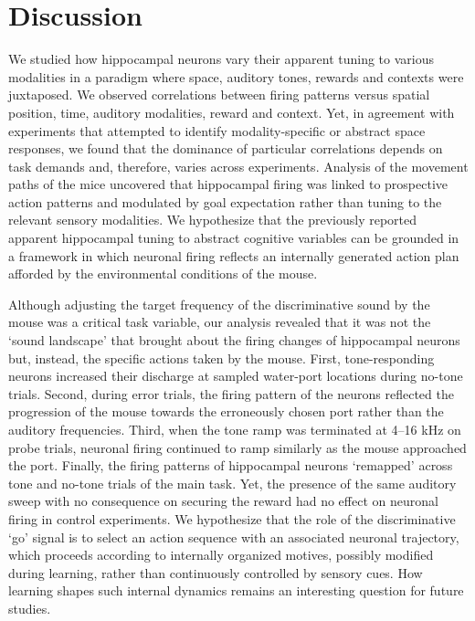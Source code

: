 \section{Discussion}

We studied how hippocampal neurons vary their apparent tuning to various modalities in a paradigm where space, auditory tones, rewards and contexts were juxtaposed. We observed correlations between firing patterns versus spatial position, time, auditory modalities, reward and context. Yet, in agreement with experiments that attempted to identify modality-specific or abstract space responses, we found that the dominance of particular correlations depends on task demands and, therefore, varies across experiments. Analysis of the movement paths of the mice uncovered that hippocampal firing was linked to prospective action patterns and modulated by goal expectation rather than tuning to the relevant sensory modalities. We hypothesize that the previously reported apparent hippocampal tuning to abstract cognitive variables can be grounded in a framework in which neuronal firing reflects an internally generated action plan afforded by the environmental conditions of the mouse.

Although adjusting the target frequency of the discriminative sound by the mouse was a critical task variable, our analysis revealed that it was not the `sound landscape' that brought about the firing changes of hippocampal neurons but, instead, the specific actions taken by the mouse. First, tone-responding neurons increased their discharge at sampled water-port locations during no-tone trials. Second, during error trials, the firing pattern of the neurons reflected the progression of the mouse towards the erroneously chosen port rather than the auditory frequencies. Third, when the tone ramp was terminated at 4--16 kHz on probe trials, neuronal firing continued to ramp similarly as the mouse approached the port. Finally, the firing patterns of hippocampal neurons `remapped' across tone and no-tone trials of the main task. Yet, the presence of the same auditory sweep with no consequence on securing the reward had no effect on neuronal firing in control experiments. We hypothesize that the role of the discriminative `go' signal is to select an action sequence with an associated neuronal trajectory, which proceeds according to internally organized motives, possibly modified during learning, rather than continuously controlled by sensory cues. How learning shapes such internal dynamics remains an interesting question for future studies.

